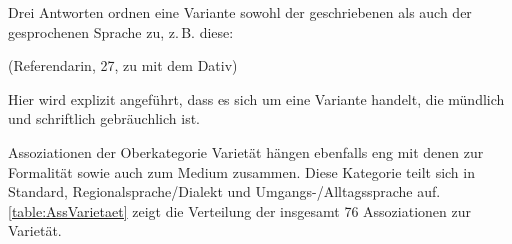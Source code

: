 Drei Antworten ordnen eine Variante sowohl der geschriebenen als auch der gesprochenen Sprache zu, z.\,B. diese: 
\begin{exe}
\ex {} (Referendarin, 27, zu \dank{} mit dem Dativ)
\end{exe}
Hier wird explizit angeführt, dass es sich um eine Variante handelt, die mündlich und schriftlich gebräuchlich ist. 

Assoziationen der Oberkategorie \glqq Varietät\grqq{} hängen ebenfalls eng mit denen zur Formalität sowie auch zum Medium zusammen. 
Diese Kategorie teilt sich in \glqq Standard\grqq, \glqq Regionalsprache/Dialekt\grqq{} und \glqq Umgangs-/Alltagssprache\grqq{} auf. 
\autoref{table:AssVarietaet} zeigt die Verteilung der insgesamt 76 Assoziationen zur Varietät. 


